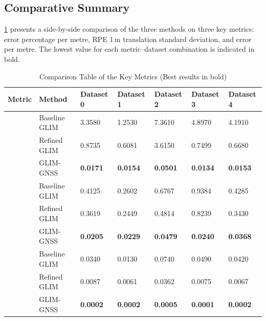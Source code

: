 \subsection{Comparative Summary}

\cref{tab:comparison_table_key_metrics} presents a side-by-side comparison of the three methods on three key metrics: error percentage per metre, RPE 1\,m translation standard deviation, and error per metre. The lowest value for each metric--dataset combination is indicated in bold.

\begin{table}[htbp]
\centering
\caption{Comparison Table of the Key Metrics (Best results in bold)}
\label{tab:comparison_table_key_metrics}
\begin{tabularx}{\textwidth}{>{\hsize=0.8\hsize}X >{\hsize=1.2\hsize}X XXXXX} %
\toprule
\textbf{Metric} & \textbf{Method} & \textbf{Dataset 0} & \textbf{Dataset 1} & \textbf{Dataset 2} & \textbf{Dataset 3} & \textbf{Dataset 4} \\ \midrule

\multirow{3}{=}{error percent per meter (\%)} & Baseline GLIM & 3.3580 & 1.2530 & 7.3610 & 4.8970 & 4.1910 \\
 & Refined GLIM & 0.8735 & 0.6081 & 3.6150 & 0.7499 & 0.6680 \\
 & GLIM-GNSS & \textbf{0.0171} & \textbf{0.0154} & \textbf{0.0501} & \textbf{0.0134} & \textbf{0.0153} \\ \midrule

\multirow{3}{=}{RPE 1m translation std} & Baseline GLIM & 0.4125 & 0.2602 & 0.6767 & 0.9384 & 0.4285 \\
 & Refined GLIM & 0.3619 & 0.2449 & 0.4814 & 0.8239 & 0.3430 \\
 & GLIM-GNSS & \textbf{0.0205} & \textbf{0.0229} & \textbf{0.0479} & \textbf{0.0240} & \textbf{0.0368} \\ \midrule

\multirow{3}{=}{error per meter (m)} & Baseline GLIM & 0.0340 & 0.0130 & 0.0740 & 0.0490 & 0.0420 \\
 & Refined GLIM & 0.0087 & 0.0061 & 0.0362 & 0.0075 & 0.0067 \\
 & GLIM-GNSS & \textbf{0.0002} & \textbf{0.0002} & \textbf{0.0005} & \textbf{0.0001} & \textbf{0.0002} \\ \bottomrule
\end{tabularx}
\end{table}

